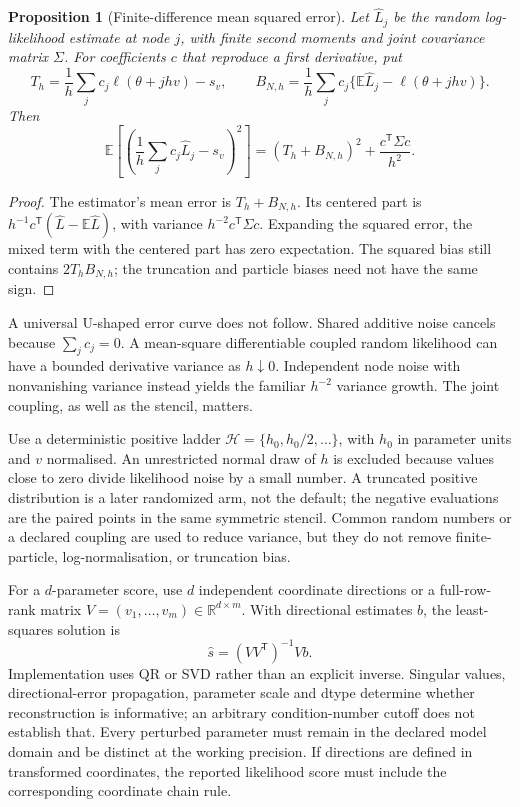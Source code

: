 \documentclass[11pt]{article}
\newtheorem{proposition}{Proposition}
\begin{document}
\begin{proposition}[Finite-difference mean squared error]
\label{prop:fd-mse}
Let $\widehat L_j$ be the random log-likelihood estimate at node $j$, with
finite second moments and joint covariance matrix $\Sigma$. For coefficients
$c$ that reproduce a first derivative, put
\begin{equation}
 T_h=\frac1h\sum_j c_j\ell(\theta+jhv)-s_v,\qquad
 B_{N,h}=\frac1h\sum_j c_j\{\mathbb E\widehat L_j-\ell(\theta+jhv)\}.
\end{equation}
Then
\begin{equation}
 \mathbb E\left[\left(\frac1h\sum_jc_j\widehat L_j-s_v\right)^2\right]
 =(T_h+B_{N,h})^2+\frac{c^{\mathsf T}\Sigma c}{h^2}.
                                                        \label{eq:fd-mse}
\end{equation}
\end{proposition}
\begin{proof}
The estimator's mean error is $T_h+B_{N,h}$. Its centered part is
$h^{-1}c^{\mathsf T}(\widehat L-\mathbb E\widehat L)$, with variance
$h^{-2}c^{\mathsf T}\Sigma c$. Expanding the squared error, the mixed term
with the centered part has zero expectation. The squared bias still contains
$2T_hB_{N,h}$; the truncation and particle biases need not have the same sign.
\end{proof}
A universal U-shaped error curve does not follow. Shared additive noise
cancels because $\sum_jc_j=0$. A mean-square differentiable coupled random
likelihood can have a bounded derivative variance as $h\downarrow0$.
Independent node noise with nonvanishing variance instead yields the familiar
$h^{-2}$ variance growth. The joint coupling, as well as the stencil, matters.

Use a deterministic positive ladder $\mathcal H=\{h_0,h_0/2,\ldots\}$,
with $h_0$ in parameter units and $v$ normalised. An unrestricted normal draw
of $h$ is excluded because values close to zero divide likelihood noise by a
small number. A truncated positive distribution is a later randomized arm,
not the default; the negative evaluations are the paired points in the same
symmetric stencil. Common random numbers or a declared coupling are used to
reduce variance, but they do not remove finite-particle, log-normalisation, or
truncation bias.

For a $d$-parameter score, use $d$ independent coordinate directions or a
full-row-rank matrix $V=(v_1,\ldots,v_m)\in\mathbb R^{d\times m}$. With
directional estimates $b$, the least-squares solution is
\begin{equation}
 \widehat s=(VV^{\mathsf T})^{-1}Vb.        \label{eq:fd-direction-solve}
\end{equation}
Implementation uses QR or SVD rather than an explicit inverse. Singular
values, directional-error propagation, parameter scale and dtype determine
whether reconstruction is informative; an arbitrary condition-number cutoff
does not establish that. Every perturbed parameter must remain in the declared
model domain and be distinct at the working precision. If directions are
defined in transformed coordinates, the reported likelihood score must include
the corresponding coordinate chain rule.
\end{document}
